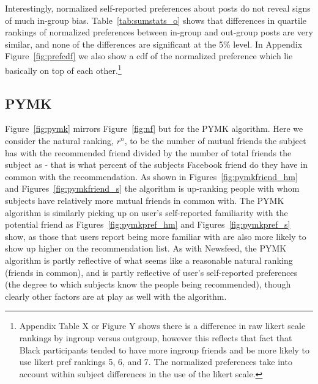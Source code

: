 \documentclass[12pt,letterpaper]{article}
\begin{document}
Interestingly, normalized self-reported preferences about posts do not reveal signs of much in-group bias. Table~\ref{tab:sumstats_o} shows that differences in quartile rankings of normalized preferences between in-group and out-group posts are very similar, and none of the differences are significant at the 5\% level. In Appendix Figure~\ref{fig:prefcdf} we also show a cdf of the normalized preference which lie basically on top of each other.\footnote{Appendix Table X or Figure Y shows there is a difference in raw likert scale rankings by ingroup versus outgroup, however this reflects that fact that Black participants tended to have more ingroup friends and be more likely to use likert pref rankings 5, 6, and 7. The normalized preferences take into account within subject differences in the use of the likert scale.} 

\subsection{PYMK}

Figure~\ref{fig:pymk} mirrors Figure~\ref{fig:nf} but for the PYMK algorithm. Here we consider the natural ranking, $r^n$, to be the number of mutual friends the subject has with the recommended friend divided by the number of total friends the subject as - that is what percent of the subjects Facebook friend do they have in common with the recommendation.  As shown in Figures~\ref{fig:pymkfriend_hm} and Figures~\ref{fig:pymkfriend_s} the algorithm is up-ranking people with whom subjects have relatively more mutual friends in common with. The PYMK algorithm is similarly picking up on user's self-reported familiarity with the potential friend as Figures~\ref{fig:pymkpref_hm} and Figures~\ref{fig:pymkpref_s} show, as those that users report being more familiar with are also more likely to show up higher on the recommendation list. As with Newsfeed, the PYMK algorithm is partly reflective of what seems like a reasonable natural ranking (friends in common), and is partly reflective of user's self-reported preferences (the degree to which subjects know the people being recommended), though clearly other factors are at play as well with the algorithm.
\end{document}
